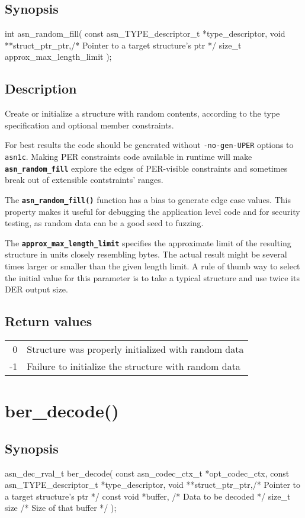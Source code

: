 \documentclass[english,oneside,12pt]{book}
\newcommand{\apisection}[2]{\clearpage\section{\label{#1}#2}}
\newcommand{\code}[1]{\texttt{\textbf{\lstinline{#1}}}}
\newcommand{\cmd}[1]{\texttt{#1}}
\begin{document}
\subsection*{Synopsis}
\begin{signature}
int asn_random_fill(
    const asn_TYPE_descriptor_t *type_descriptor,
    void **struct_ptr_ptr,/* Pointer to a target structure's ptr */
    size_t approx_max_length_limit
);
\end{signature}

\subsection*{Description}

Create or initialize a structure with random contents, according to the type
specification and optional member constraints.

For best results the code should be generated without \cmd{-no-gen-UPER}
options to \cmd{asn1c}. Making PER constraints code available in runtime
will make \code{asn_random_fill} explore the edges of PER-visible constraints
and sometimes break out of extensible contstraints' ranges.

The \code{asn_random_fill()} function has a bias to generate edge case
values. This property makes it useful for debugging the application level
code and for security testing, as random data can be a good seed to fuzzing.

The \code{approx_max_length_limit} specifies the approximate limit of the
resulting structure in units closely resembling bytes. The actual result
might be several times larger or smaller than the given length limit.
A rule of thumb way to select the initial value for this parameter
is to take a typical structure and use twice its DER output size.

\subsection*{Return values}

\begin{tabular}[h!]{rl}
0 & Structure was properly initialized with random data \\
-1 & Failure to initialize the structure with random data
\end{tabular}

\apisection{sec:ber_decode}{ber\_decode()}

\subsection*{Synopsis}
\begin{signature}
asn_dec_rval_t ber_decode(
    const asn_codec_ctx_t *opt_codec_ctx,
    const asn_TYPE_descriptor_t *type_descriptor,
    void **struct_ptr_ptr,/* Pointer to a target structure's ptr */
    const void *buffer,   /* Data to be decoded */
    size_t size           /* Size of that buffer */
);
\end{signature}
\end{document}
